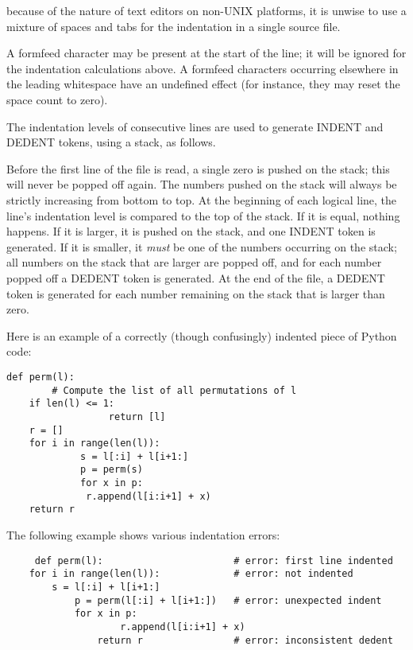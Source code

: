  because of the nature of
text editors on non-UNIX platforms, it is unwise to use a mixture of
spaces and tabs for the indentation in a single source file.

A formfeed character may be present at the start of the line; it will
be ignored for the indentation calculations above.  A formfeed
characters occurring elsewhere in the leading whitespace have an
undefined effect (for instance, they may reset the space count to
zero).

The indentation levels of consecutive lines are used to generate
INDENT and DEDENT tokens, using a stack, as follows.

Before the first line of the file is read, a single zero is pushed on
the stack; this will never be popped off again.  The numbers pushed on
the stack will always be strictly increasing from bottom to top.  At
the beginning of each logical line, the line's indentation level is
compared to the top of the stack.  If it is equal, nothing happens.
If it is larger, it is pushed on the stack, and one INDENT token is
generated.  If it is smaller, it \emph{must} be one of the numbers
occurring on the stack; all numbers on the stack that are larger are
popped off, and for each number popped off a DEDENT token is
generated.  At the end of the file, a DEDENT token is generated for
each number remaining on the stack that is larger than zero.

Here is an example of a correctly (though confusingly) indented piece
of Python code:

\begin{verbatim}
def perm(l):
        # Compute the list of all permutations of l
    if len(l) <= 1:
                  return [l]
    r = []
    for i in range(len(l)):
             s = l[:i] + l[i+1:]
             p = perm(s)
             for x in p:
              r.append(l[i:i+1] + x)
    return r
\end{verbatim}

The following example shows various indentation errors:

\begin{verbatim}
     def perm(l):                       # error: first line indented
    for i in range(len(l)):             # error: not indented
        s = l[:i] + l[i+1:]
            p = perm(l[:i] + l[i+1:])   # error: unexpected indent
            for x in p:
                    r.append(l[i:i+1] + x)
                return r                # error: inconsistent dedent
\end{verbatim}

